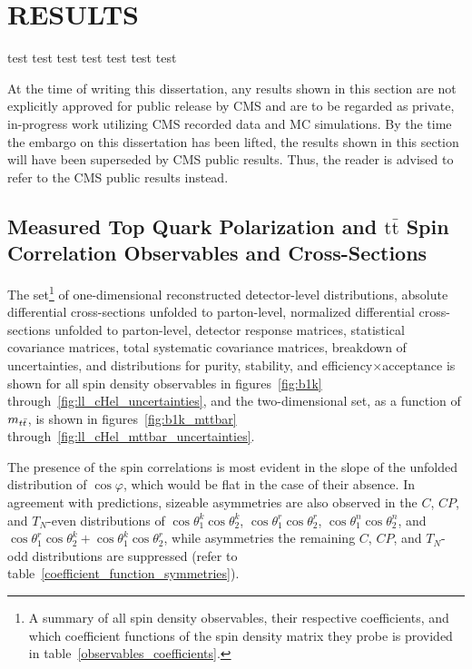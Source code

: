 
\chapter{RESULTS}
\label{Results}

\begin{cabstract}
test test test test test test test
\end{cabstract}

At the time of writing this dissertation, any results shown in this section are not explicitly approved for public release by CMS and are to be regarded as private, in-progress work utilizing CMS recorded data and MC simulations.
By the time the embargo on this dissertation has been lifted, the results shown in this section will have been superseded by CMS public results.
Thus, the reader is advised to refer to the CMS public results instead.

\section{Measured Top Quark Polarization and \ensuremath{\mathrm{t\bar{t}}} Spin Correlation Observables and Cross-Sections}
The set\footnote{A summary of all spin density observables, their respective coefficients, and which coefficient functions of the spin density matrix they probe is provided in table~\ref{observables_coefficients}.} of one-dimensional reconstructed detector-level distributions, absolute differential cross-sections unfolded to parton-level, normalized differential cross-sections unfolded to parton-level, detector response matrices, statistical covariance matrices, total systematic covariance matrices, breakdown of uncertainties, and distributions for purity, stability, and efficiency$\times$acceptance is shown for all spin density observables in figures~\ref{fig:b1k} through~\ref{fig:ll_cHel_uncertainties}, and the two-dimensional set, as a function of $m_{t\bar{t}}$, is shown in figures~\ref{fig:b1k_mttbar} through~\ref{fig:ll_cHel_mttbar_uncertainties}.

The presence of the spin correlations is most evident in the slope of the unfolded distribution of $\cos\varphi$, which would be flat in the case of their absence.
In agreement with predictions, sizeable asymmetries are also observed in the $C$, $CP$, and $T_N$-even distributions of $\cos\theta_{1}^{k}\cos\theta_{2}^{k}$, $\cos\theta_{1}^{r}\cos\theta_{2}^{r}$, $\cos\theta_{1}^{n}\cos\theta_{2}^{n}$, and $\cos\theta_{1}^{r}\cos\theta_{2}^{k}+\cos\theta_{1}^{k}\cos\theta_{2}^{r}$, while asymmetries the remaining $C$, $CP$, and $T_N$-odd distributions are suppressed (refer to table~\ref{coefficient_function_symmetries}).


